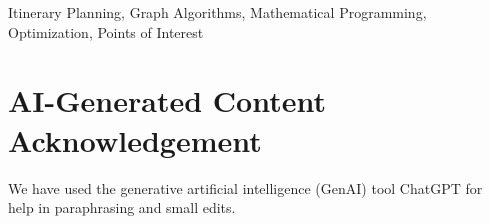 \documentclass[conference]{IEEEtran}
\begin{document}
\begin{IEEEkeywords}
Itinerary Planning, Graph Algorithms, Mathematical Programming, Optimization, Points of Interest
\end{IEEEkeywords}









\pagebreak

\section*{AI-Generated Content Acknowledgement}

We have used the generative artificial intelligence (GenAI) tool ChatGPT for help in paraphrasing and small edits.

%


\end{document}
